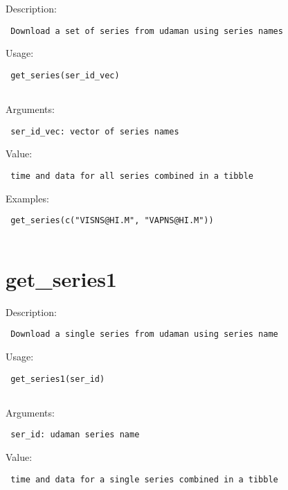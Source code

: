 \documentclass[
  letterpaper,
  DIV=11,
  numbers=noendperiod]{scrreport}
\begin{document}
Description:

\begin{verbatim}
 Download a set of series from udaman using series names
\end{verbatim}

Usage:

\begin{verbatim}
 get_series(ser_id_vec)
 
\end{verbatim}

Arguments:

\begin{verbatim}
 ser_id_vec: vector of series names
\end{verbatim}

Value:

\begin{verbatim}
 time and data for all series combined in a tibble
\end{verbatim}

Examples:

\begin{verbatim}
 get_series(c("VISNS@HI.M", "VAPNS@HI.M"))
 
\end{verbatim}

\hypertarget{get_series1}{%
\section{get\_series1}\label{get_series1}}

Description:

\begin{verbatim}
 Download a single series from udaman using series name
\end{verbatim}

Usage:

\begin{verbatim}
 get_series1(ser_id)
 
\end{verbatim}

Arguments:

\begin{verbatim}
 ser_id: udaman series name
\end{verbatim}

Value:

\begin{verbatim}
 time and data for a single series combined in a tibble
\end{verbatim}
\end{document}
